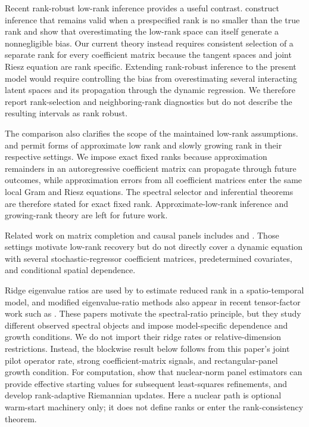 \documentclass[11pt]{article}
\numberwithin{equation}{section}
\theoremstyle{remark}
\begin{document}
Recent rank-robust low-rank inference provides a useful contrast. \citet{choi2026rank} construct inference that remains valid when a prespecified rank is no smaller than the true rank and show that overestimating the low-rank space can itself generate a nonnegligible bias. Our current theory instead requires consistent selection of a separate rank for every coefficient matrix because the tangent spaces and joint Riesz equation are rank specific. Extending rank-robust inference to the present model would require controlling the bias from overestimating several interacting latent spaces and its propagation through the dynamic regression. We therefore report rank-selection and neighboring-rank diagnostics but do not describe the resulting intervals as rank robust.

The comparison also clarifies the scope of the maintained low-rank assumptions. \citet{chernozhukov2023} and \citet{choi2024} permit forms of approximate low rank and slowly growing rank in their respective settings. We impose exact fixed ranks because approximation remainders in an autoregressive coefficient matrix can propagate through future outcomes, while approximation errors from all coefficient matrices enter the same local Gram and Riesz equations. The spectral selector and inferential theorems are therefore stated for exact fixed rank. Approximate-low-rank inference and growing-rank theory are left for future work.

Related work on matrix completion and causal panels includes \citet{athey2021matrix} and \citet{bai_ng2021matrix}. Those settings motivate low-rank recovery but do not directly cover a dynamic equation with several stochastic-regressor coefficient matrices, predetermined covariates, and conditional spatial dependence.

Ridge eigenvalue ratios are used by \citet{pu2025} to estimate reduced rank in a spatio-temporal model, and modified eigenvalue-ratio methods also appear in recent tensor-factor work such as \citet{barigozzihe2023}. These papers motivate the spectral-ratio principle, but they study different observed spectral objects and impose model-specific dependence and growth conditions. We do not import their ridge rates or relative-dimension restrictions. Instead, the blockwise result below follows from this paper's joint pilot operator rate, strong coefficient-matrix signals, and rectangular-panel growth condition. For computation, \citet{moonweidner2026} show that nuclear-norm panel estimators can provide effective starting values for subsequent least-squares refinements, and \citet{gaoabsil2022} develop rank-adaptive Riemannian updates. Here a nuclear path is optional warm-start machinery only; it does not define ranks or enter the rank-consistency theorem.
\end{document}
